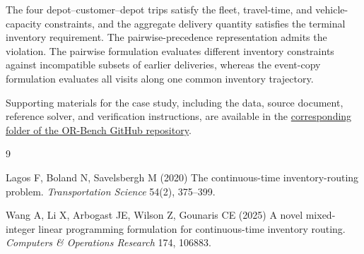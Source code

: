 \documentclass[10pt]{article}
\begin{document}
The four depot--customer--depot trips satisfy the fleet, travel-time, and vehicle-capacity constraints, and the aggregate delivery quantity satisfies the terminal inventory requirement. The pairwise-precedence representation admits the violation. The pairwise formulation evaluates different inventory constraints against incompatible subsets of earlier deliveries, whereas the event-copy formulation evaluates all visits along one common inventory trajectory.

Supporting materials for the case study, including the data, source document, reference solver, and verification instructions, are available in the \href{https://github.com/Zhengzhong-You/OR-Bench/tree/main/problems/01_event_ordered_continuous_time_replenishment}{corresponding folder of the OR-Bench GitHub repository}.

\begin{thebibliography}{9}\small

Lagos F, Boland N, Savelsbergh M (2020)
The continuous-time inventory-routing problem.
\emph{Transportation Science} 54(2), 375--399.

Wang A, Li X, Arbogast JE, Wilson Z, Gounaris CE (2025)
A novel mixed-integer linear programming formulation for continuous-time inventory routing.
\emph{Computers \& Operations Research} 174, 106883.

\end{thebibliography}
\end{document}

